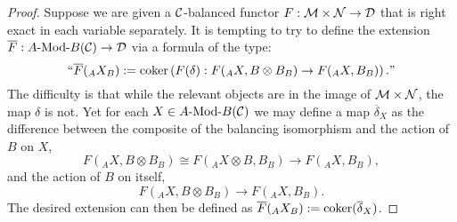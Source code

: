 \documentclass{amsart}
\begin{document}
\begin{proof}
Suppose we are given a $\mathcal C$-balanced functor $F:\mathcal M \times \mathcal N \to \mathcal D$ that is right exact in each variable separately. It is tempting to try to define the extension $\overline{F}: \Mod{A}{B}(\cC) \to \cD$ via a formula of the type:
\begin{equation*}
	``\overline{F}({}_A X_B) := \operatorname*{coker} \left( F(\delta): F( {}_A X, B \otimes B_B) \to F({}_A X, B_B) \right)."
\end{equation*} 
The difficulty is that while the relevant objects are in the image of $\mathcal M \times \mathcal N$, the map $\delta$ is not. 
Yet for each $X \in \Mod{A}{B}(\cC)$ we may define a map $\overline{\delta}_X$ as the difference between the composite of the balancing isomorphism and the action of $B$ on $X$,
\begin{equation*}
F( {}_A X, B \otimes B_B) \cong F({}_A X \otimes B, B_B) \to F({}_A X, B_B),
\end{equation*}
and the action of $B$ on itself,
\begin{equation*}
F( {}_A X, B \otimes B_B) \to F({}_A X, B_B).
\end{equation*}
The desired extension can then be defined as $\overline{F}({}_A X_B) := \operatorname*{coker}(\overline{\delta}_X)$.

\end{proof}
\end{document}
